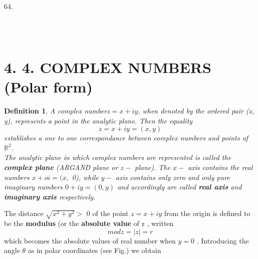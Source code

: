 \documentclass[11pt]{amsbook}
\newtheorem{definition}{Definition}
\begin{document}
64. \\ \\
 \\ 
\section{4. 4. COMPLEX NUMBERS (Polar form)}
\begin{definition}
A complex number$ z = x + iy$, when denoted by the ordered pair (x, y), represents a point  in the analytic plane. Then the equality 
\begin{equation}
z = x + iy = (x, y) 
\end{equation}
establishes  a one to one correspondance between complex numbers and points of ${\mathbb{R}^2}$. \\
The analytic plane in which complex numbers are represented is called the \textbf{complex plane} (ARGAND plane or $z -$ plane). The $x -$ axis contains the real numbers $x+ oi = (x,$ 0), while $y -$ axis contains only zero and only pure imaginary  numbers      
$0 + iy = (0, y)$ and accordingly are called \textbf{real axis} and \textbf{imaginary axis} respectively. \\
\end{definition}

The distance $\sqrt{{x^2}+{y^2}} >$ 0 of the point $z= x + iy$ from the origin is defined to be the \textbf{modulus} (or  the \textbf{absolute value} of z , written 
\begin{equation}
mod z =  |z| = r
\end{equation}
which becomes the absolute values of real number when $y = 0 $ . Introducing the angle $\theta$ as in polar coordinates (see Fig.)
we obtain
\end{document}
